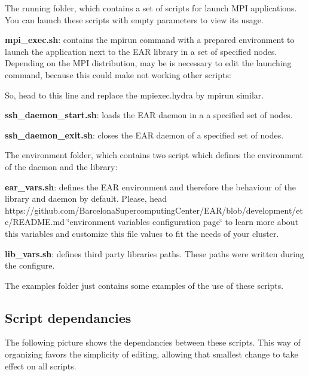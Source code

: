 The {\ttfamily running} folder, which contains a set of scripts for launch M\+PI applications. You can launch these scripts with empty parameters to view its usage.
\begin{DoxyItemize}
\item {\bfseries mpi\+\_\+exec.\+sh}\+: contains the {\ttfamily mpirun} command with a prepared environment to launch the application next to the E\+AR library in a set of specified nodes. Depending on the M\+PI distribution, may be is necessary to edit the launching command, because this could make not working other scripts\+: 
 So, head to this line and replace the {\ttfamily mpiexec.\+hydra} by {\ttfamily mpirun} similar.
\item {\bfseries ssh\+\_\+daemon\+\_\+start.\+sh}\+: loads the E\+AR daemon in a a specified set of nodes.
\item {\bfseries ssh\+\_\+daemon\+\_\+exit.\+sh}\+: closes the E\+AR daemon of a specified set of nodes.
\end{DoxyItemize}

The {\ttfamily environment} folder, which contains two script which defines the environment of the daemon and the library\+:
\begin{DoxyItemize}
\item {\bfseries ear\+\_\+vars.\+sh}\+: defines the E\+AR environment and therefore the behaviour of the library and daemon by default. Please, head https\+://github.com/\+Barcelona\+Supercomputing\+Center/\+E\+A\+R/blob/development/etc/\+R\+E\+A\+D\+M\+E.\+md \char`\"{}environment variables configuration page\char`\"{} to learn more about this variables and customize this file values to fit the needs of your cluster.
\item {\bfseries lib\+\_\+vars.\+sh}\+: defines third party libraries paths. These paths were written during the {\ttfamily configure}.
\end{DoxyItemize}

The {\ttfamily examples} folder just contains some examples of the use of these scripts.

\subsection*{Script dependancies }

The following picture shows the dependancies between these scripts. This way of organizing favors the simplicity of editing, allowing that smallest change to take effect on all scripts.

 